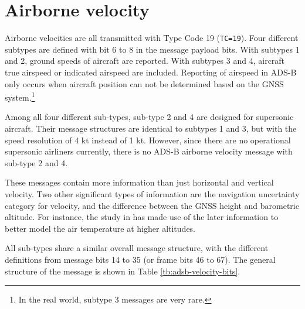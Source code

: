 \chapter{Airborne velocity}

Airborne velocities are all transmitted with Type Code 19 (\texttt{TC=19}). Four different subtypes are defined with bit 6 to 8 in the message payload bits. With subtypes 1 and 2, ground speeds of aircraft are reported. With subtypes 3 and 4, aircraft true airspeed or indicated airspeed are included. Reporting of airspeed in ADS-B only occurs when aircraft position can not be determined based on the GNSS system.\footnote{In the real world, subtype 3 messages are very rare.}

Among all four different sub-types, sub-type 2 and 4 are designed for supersonic aircraft. Their message structures are identical to subtypes 1 and 3, but with the speed resolution of 4 kt instead of 1 kt. However, since there are no operational supersonic airliners currently, there is no ADS-B airborne velocity message with sub-type 2 and 4.

These messages contain more information than just horizontal and vertical velocity. Two other significant types of information are the navigation uncertainty category for velocity, and the difference between the GNSS height and barometric altitude. For instance, the study in \cite{stone2015} has made use of the later information to better model the air temperature at higher altitudes.

All sub-types share a similar overall message structure, with the different definitions from message bits 14 to 35 (or frame bits 46 to 67). The general structure of the message is shown in Table \ref{tb:adsb-velocity-bits}. 

